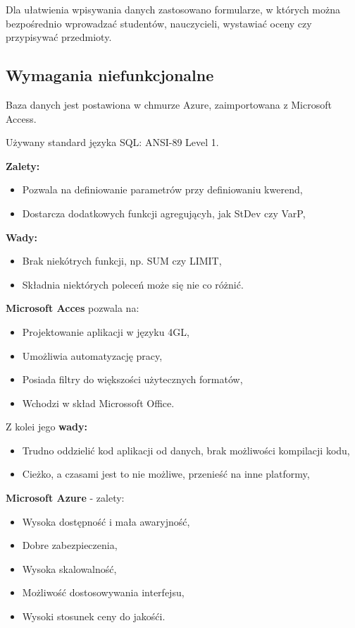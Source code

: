 \documentclass[12pt,a4paper]{article}
\begin{document}
Dla ułatwienia wpisywania danych zastosowano formularze, w których można bezpośrednio wprowadzać studentów, nauczycieli, wystawiać oceny czy przypisywać przedmioty.

\subsection{Wymagania niefunkcjonalne}
\label{sec:NonFunctionalConditions}

Baza danych jest postawiona w chmurze \cite{quora}Azure, zaimportowana z \newline\cite{logz.io}Microsoft Access.

Używany standard języka SQL: ANSI-89 Level 1.

\textbf{Zalety:}
\begin{itemize}
	\item Pozwala na definiowanie parametrów przy definiowaniu kwerend,
	\item Dostarcza dodatkowych funkcji agregującyh, jak StDev czy VarP,
\end{itemize}
\newpage
\textbf{Wady:}
\begin{itemize}
	\item Brak niekótrych funkcji, np. SUM czy LIMIT,
	\item Składnia niektórych poleceń może się nie co różnić.
\end{itemize}

\textbf{Microsoft Acces} pozwala na:
\begin{itemize}
	\item Projektowanie aplikacji w języku 4GL,
	\item Umożliwia automatyzację pracy,
	\item Posiada filtry do większości użytecznych formatów,
	\item Wchodzi w skład Microssoft Office.
\end{itemize}

Z kolei jego \textbf{wady:}
\begin{itemize}
	\item Trudno oddzielić kod aplikacji od danych, brak możliwości kompilacji kodu,
	\item Cieżko, a czasami jest to nie możliwe, przenieść na inne platformy,
\end{itemize}


\textbf{Microsoft Azure} - zalety:
\begin{itemize}
	\item Wysoka dostępność i mała awaryjność,
	\item Dobre zabezpieczenia,
	\item Wysoka skalowalność,
	\item Możliwość dostosowywania interfejsu,
	\item Wysoki stosunek ceny do jakośći.
\end{itemize}
\end{document}
